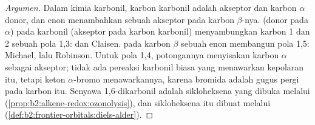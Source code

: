 \begin{proof}[Argumen]
Dalam kimia karbonil, karbon karbonil adalah akseptor dan karbon $\alpha$
donor, dan enon menambahkan sebuah akseptor pada karbon $\beta$-nya. 
(donor pada $\alpha$) pada karbonil (akseptor pada karbon karbonil)
menyambungkan karbon 1 dan 2 sebuah pola 1,3:  dan Claisen.  pada
karbon $\beta$
sebuah enon membangun pola 1,5: Michael, lalu Robinson. Untuk pola 1,4,
potongannya menyisakan karbon
$\alpha$ sebagai akseptor; tidak ada pereaksi karbonil biasa yang
menawarkan kepolaran itu, tetapi keton $\alpha$-bromo menawarkannya, karena
bromida adalah gugus pergi pada karbon itu. Senyawa 1,6-dikarbonil adalah
sikloheksena yang dibuka melalui 
(\cref{prop:b2:alkene-redox:ozonolysis}), dan sikloheksena itu dibuat
melalui 
(\cref{def:b2:frontier-orbitals:diels-alder}).
\end{proof}

